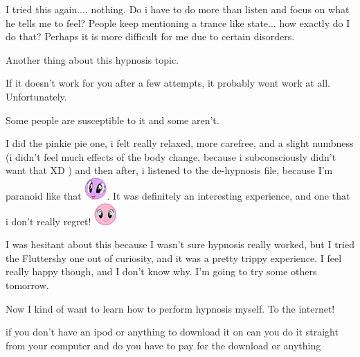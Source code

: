 \documentclass[ebook,12pt,oneside,openany]{memoir}
\newcommand{\mytexttilde}{\raisebox{0.5ex}{\texttildelow}}
\begin{document}
\begin{tcolorbox}[title=Delete this account,colback=purple!5!white,colframe=purple!75!black,coltitle=white]
\par{I tried this again.... nothing. Do i have to do more than listen and focus on what he tells me to feel?  People keep mentioning a trance like state... how exactly do I do that?  Perhaps it is more difficult for me due to certain disorders.}
\end{tcolorbox}
\begin{tcolorbox}[title=Chigens and Kay,colback=olive!5!white,colframe=olive!75!black,coltitle=white]
\par{Another thing about this hypnosis topic.}
\newline{}
\par{If it doesn't work for you after a few attempts, it probably wont work at all. Unfortunately.}
\par{Some people are susceptible to it and some aren't.}
\end{tcolorbox}
\begin{tcolorbox}[title=themildlyconfusedgamer]
\par{I did the pinkie pie one, i felt really relaxed, more carefree, and a slight numbness (i didn't feel much effects of the body change, because i subconsciously didn't want that XD ) and then after, i listened to the de-hypnosis file, because I'm paranoid like that \includegraphics{images/mlp_eW9KEfP.png}. It was definitely an interesting experience, and one that i don't really regret! \includegraphics{images/mlp_smile.png}}
\end{tcolorbox}
\begin{tcolorbox}[title=MelancholicMemory]
\par{I was hesitant about this because I wasn't sure hypnosis really worked, but I tried the Fluttershy one out of curiosity, and it was a pretty trippy experience. I feel really happy though, and I don't know why. I'm going to try some others tomorrow.}
\newline{}
\par{Now I kind of want to learn how to perform hypnosis myself. To the internet!}
\end{tcolorbox}
\begin{tcolorbox}[title=\mytexttilde{}TheStealthyPony\mytexttilde{},colback=yellow!5!white,colframe=yellow!75!black,coltitle=white]
\par{if you don't have an ipod or anything to download it on can you do it straight from your computer and do you have to pay for the download or anything}
\end{tcolorbox}
\end{document}
